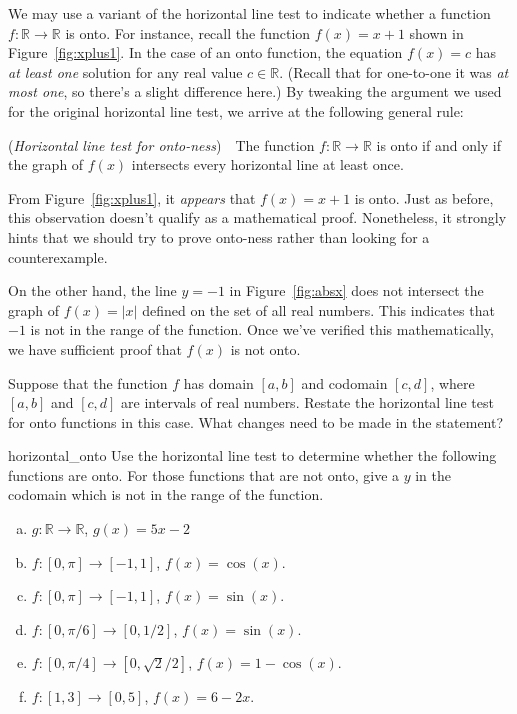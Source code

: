 \begin{rem}
We may use a variant of the horizontal line test to indicate whether a function $f:\mathbb{R} \rightarrow \mathbb{R}$ is onto.  
For instance, recall the function $f(x)=x +1$ shown in Figure~\ref{fig:xplus1}. In the case of an onto function, the equation $f(x)=c$ has \emph{at least one} solution for any real value $c \in \mathbb{R}$.  (Recall that for one-to-one it was \emph{at most one}, so there's a slight difference here.) By tweaking the argument we used for the original horizontal line test, we arrive at the following general rule:
\bigskip

\noindent 
(\emph{Horizontal line test for onto-ness})~~The function $f:\mathbb{R} \rightarrow \mathbb{R}$ is onto if and only if the graph of $f(x)$ intersects every horizontal line at least once.
\bigskip

From Figure~\ref{fig:xplus1}, it \emph{appears} that $f(x)=x+1$ is onto. Just as before, this observation doesn't qualify as a mathematical proof. Nonetheless, it strongly hints that we should try to prove onto-ness rather than looking for a counterexample.

On the other hand, the line $y=-1$ in Figure~\ref{fig:absx} does not intersect the graph of $f(x) = |x|$ defined on the set of all real numbers.  This indicates that $-1$ is not in the range of the function.  Once we've verified this mathematically, we have sufficient proof that $f(x)$ is not onto.
\end{rem}    

\begin{exercise}{}
Suppose that the function $f$ has domain $[a,b]$ and codomain $[c,d]$, where $[a,b]$ and $[c,d]$ are intervals of real numbers. Restate the horizontal line test for onto functions in this case. What changes need to be made in the statement?
\end{exercise}

\begin{exercise}{horizontal_onto}
Use the horizontal line test to determine whether the following functions are onto.  For those functions that are not onto, give a $y$ in the codomain which is not in the range of the function.
\begin{multicols}{2}
\begin{enumerate}[(a)]
\item
$g \colon \mathbb{R} \to \mathbb{R}$, $g(x) = 5x - 2$
\item
$f:[0,\pi] \rightarrow [-1,1]$, $f(x) = \cos(x)$.
\item
$f:[0,\pi] \rightarrow [-1,1]$, $f(x) = \sin(x)$.
\item
$f:[0,\pi/6] \rightarrow [0,1/2]$, $f(x) = \sin(x)$.
\item
$f:[0,\pi/4] \rightarrow [0,\sqrt{2}/2]$, $f(x) = 1-\cos(x)$.
\item
$f:[1,3] \rightarrow [0,5]$, $f(x) = 6 - 2x$.
\end{enumerate}
\end{multicols}
\end{exercise}
 

